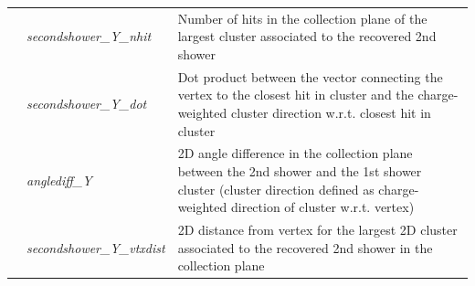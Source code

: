 \begin{table}[ht]
\begin{tabular}{ m{} | m{} | m{}  }
\hline
\hline
\multicolumn{1}{l|}{} & \emph{secondshower\_Y\_nhit} & Number of hits in the collection plane of the largest cluster associated to the  recovered 2nd shower  \\  \cline{2-3}
\parbox[t]{2mm}{}  & \emph{secondshower\_Y\_dot} &  Dot product between the vector connecting the vertex to the closest hit in cluster and the charge-weighted cluster direction w.r.t. closest hit in cluster \\  
 & \emph{anglediff\_Y} & 2D angle difference in the collection plane between the 2nd shower and the 1st shower cluster  (cluster direction defined as charge-weighted direction of cluster w.r.t. vertex) \\ 
 & \emph{secondshower\_Y\_vtxdist} & 2D distance from vertex for the largest 2D cluster associated to the  recovered 2nd shower in the collection plane \\
\hline
\end{tabular}
\label{tab:variableSummary}
\end{table}
